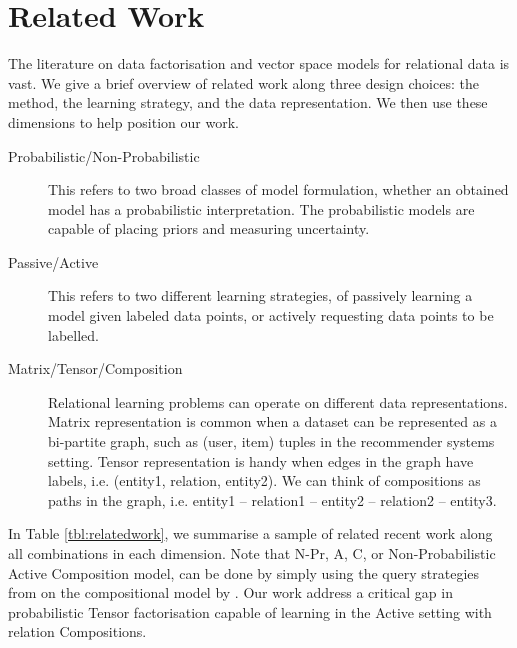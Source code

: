 
\section{Related Work}

The literature on data factorisation and vector space models for 
relational data is vast. 
We give a brief overview of related work along three design choices:
the method, the learning strategy, and the data representation. 
We then use these dimensions to help position our work. 
\begin{description}
\item[Probabilistic/Non-Probabilistic] This refers to two broad classes of model 
formulation, whether an obtained model has a probabilistic interpretation. The probabilistic models are capable of placing priors and measuring uncertainty.
\item[Passive/Active] This refers to two different learning strategies, 
of passively learning a model given labeled data points, or actively 
requesting data points to be labelled.
\item[Matrix/Tensor/Composition] Relational learning problems can operate on 
different data representations. Matrix representation is common when a dataset 
can be represented as a bi-partite graph, such as (user, item) tuples in the 
recommender systems setting. Tensor representation is handy when edges in the 
graph have labels, i.e. (entity1, relation, entity2). We can think of 
compositions as paths in the graph, i.e. entity1 -- relation1 -- entity2 -- 
relation2 -- entity3.
\end{description}
In Table \ref{tbl:relatedwork}, we summarise a sample of related recent work 
along all combinations in each dimension. 
Note that N-Pr, A, C, or Non-Probabilistic Active Composition model, can be done by 
simply using the query strategies from \cite{kajino2015active} on the 
compositional model by \cite{guu2015traversing}. Our work address a critical gap 
in probabilistic Tensor factorisation capable of learning in the 
Active setting with relation Compositions.


